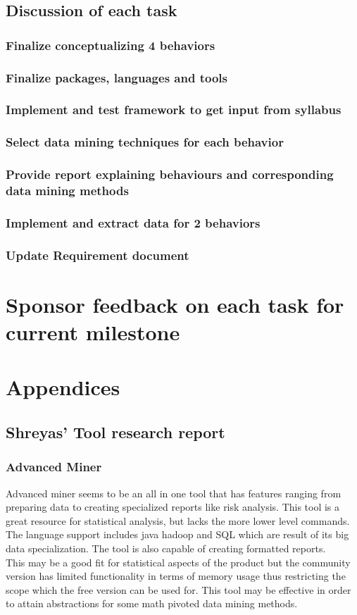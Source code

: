 \documentclass[12pt]{article}
\begin{document}
	\subsection{Discussion of each task}
	\subsubsection{Finalize conceptualizing 4 behaviors }
	\subsubsection{Finalize packages, languages and tools}
	\subsubsection{Implement and test framework to get input from syllabus}
	\subsubsection{Select data mining techniques for each behavior}
	\subsubsection{Provide report explaining behaviours and corresponding data mining methods}
	\subsubsection{Implement and extract data for 2 behaviors}
	\subsubsection{Update Requirement document}
	\section{Sponsor feedback on each task for current milestone}
	\pagebreak
	\section{Appendices}
	\subsection{Shreyas' Tool research report} \label{app_shr}
	\subsubsection{Advanced Miner} \label{adv}
	Advanced miner seems to be an all in one tool that has features ranging from preparing data to creating specialized reports like risk analysis. This tool is a great resource for statistical analysis, but lacks the more lower level commands. \\
	The language support includes java hadoop and SQL which are result of its big data specialization. The tool is also capable of creating formatted reports.\\
	This may be a good fit for statistical aspects of the product but the community version has limited functionality in terms of memory usage thus restricting the scope which the free version can be used for. This tool may be effective in order to attain abstractions for some math pivoted data mining methods.
\end{document}
